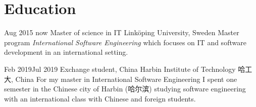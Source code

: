 \documentclass[]{k-cv} %
\begin{document}
\section{Education}

\begin{entrylist}
\entry
{Aug 2015 \newline\to now}
{Master of science in IT}
{Linköping University, Sweden}
{Master program \emph{International Software Engineering} which focuses on IT and software development in an international setting.}

\entry
{Feb 2019\newline\to Jul 2019}
{Exchange student, China}
{Harbin Institute of Technology 哈工大, China}
{For my master in International Software Engineering I spent one semester in the
Chinese city of Harbin (哈尔滨) studying software engineering with an
international class with Chinese and foreign students.}
\end{entrylist}
\end{document}
